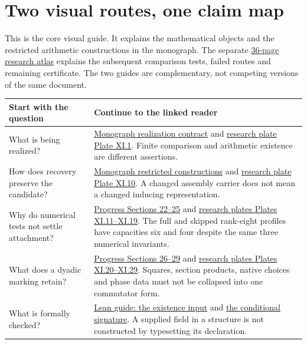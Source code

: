 \section*{Two visual routes, one claim map}
{}
This is the core visual guide. It explains the mathematical objects and the restricted arithmetic constructions in the monograph. The separate \href{https://komorebi.invalid/b07/visual_atlas}{36-page research atlas} explains the subsequent comparison tests, failed routes and remaining certificate. The two guides are complementary, not competing versions of the same document.

\begin{tabular}{@{}>{\raggedright\arraybackslash}p{.28\linewidth}>{\raggedright\arraybackslash}p{.67\linewidth}@{}}\toprule
Start with the question & Continue to the linked reader\\\midrule
What is being realized? & \href{https://komorebi.invalid/b07/visual_contract}{Monograph realization contract} and \href{https://komorebi.invalid/b07/visual_v01}{research plate Plate XI.1}. Finite comparison and arithmetic existence are different assertions.\\[9pt]
How does recovery preserve the candidate? & \href{https://komorebi.invalid/b07/visual_recovery}{Monograph restricted constructions} and \href{https://komorebi.invalid/b07/visual_v10}{research plate Plate XI.10}. A changed assembly carrier does not mean a changed inducing representation.\\[9pt]
Why do numerical tests not settle attachment? & \href{https://komorebi.invalid/b07/visual_conductors}{Progress Sections 22--25} and \href{https://komorebi.invalid/b07/visual_v15}{research plates Plates XI.11--XI.19}. The full and skipped rank-eight profiles have capacities six and four despite the same three numerical invariants.\\[9pt]
What does a dyadic marking retain? & \href{https://komorebi.invalid/b07/visual_marks}{Progress Sections 26--29} and \href{https://komorebi.invalid/b07/visual_v20}{research plates Plates XI.20--XI.29}. Squares, section products, native choices and phase data must not be collapsed into one commutator form.\\[9pt]
What is formally checked? & \href{https://komorebi.invalid/b07/visual_lean_input}{Lean guide: the existence input} and \href{https://komorebi.invalid/b07/visual_lean_signature}{the conditional signature}. A supplied field in a structure is not constructed by typesetting its declaration.\\\bottomrule
\end{tabular}

